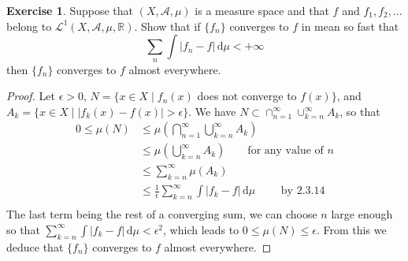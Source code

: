 \documentclass[11pt,a4paper,twoside]{article}
\theoremstyle{definition}
\newcounter{excounter}
\newtheorem{exercise}[excounter]{Exercise}
\begin{document}
\begin{exercise}
  Suppose that $(X, \mathscr{A}, \mu)$ is a measure space and that $f$ and $f_1, f_2, \ldots$ belong to
  $\mathscr{L}^1 (X, \mathscr{A}, \mu, \mathbb{R})$. Show that if $\{ f_n \}$ converges to $f$ in mean so fast that
  \[
  \sum_n \int | f_n - f | \,\mathrm{d}\mu < +\infty
  \]
  then $\{ f_n \}$ converges to $f$ almost everywhere.
\end{exercise}

\begin{proof}
  Let $\epsilon > 0$, $N = \{ x \in X \mid f_n (x)$ does not converge to $f (x) \}$, and $A_k = \{ x \in X \mid | f_k (x) - f (x) | > \epsilon \}$.
  We have $N \subset \cap_{n = 1}^{\infty} \cup_{k = n}^\infty A_k$, so that
  \begin{align*}
    0 \leq \mu (N) &\leq \mu \left( \bigcap_{n = 1}^\infty \bigcup_{k = n}^\infty A_k \right)\\
    &\leq \mu \left( \bigcup_{k = n}^\infty A_k \right) \qquad\text{for any value of $n$}\\
    &\leq \sum_{k = n}^\infty \mu \left( A_k \right)\\
    &\leq \frac{1}{\epsilon} \sum_{k = n}^\infty \int | f_k - f | \,\mathrm{d}\mu \qquad\text{ by 2.3.14}\\
  \end{align*}
  The last term being the rest of a converging sum, we can choose $n$  large enough so that $\sum_{k = n}^\infty \int | f_k - f | \,\mathrm{d}\mu < \epsilon^2$,
  which leads to $0 \leq \mu (N) \leq \epsilon$. From this we deduce that $\{ f_n \}$ converges to $f$ almost everywhere.
\end{proof}
\end{document}
